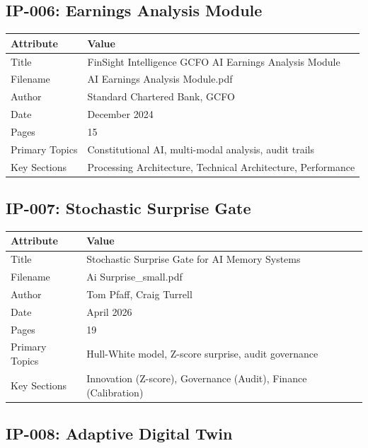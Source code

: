 \subsection{IP-006: Earnings Analysis Module}

\begin{tabularx}{\textwidth}{@{}lX@{}}
\toprule
\textbf{Attribute} & \textbf{Value} \\
\midrule
Title & FinSight Intelligence GCFO AI Earnings Analysis Module \\
Filename & AI Earnings Analysis Module.pdf \\
Author & Standard Chartered Bank, GCFO \\
Date & December 2024 \\
Pages & 15 \\
Primary Topics & Constitutional AI, multi-modal analysis, audit trails \\
Key Sections & Processing Architecture, Technical Architecture, Performance \\
\bottomrule
\end{tabularx}

\subsection{IP-007: Stochastic Surprise Gate}

\begin{tabularx}{\textwidth}{@{}lX@{}}
\toprule
\textbf{Attribute} & \textbf{Value} \\
\midrule
Title & Stochastic Surprise Gate for AI Memory Systems \\
Filename & Ai Surprise\_small.pdf \\
Author & Tom Pfaff, Craig Turrell \\
Date & April 2026 \\
Pages & 19 \\
Primary Topics & Hull-White model, Z-score surprise, audit governance \\
Key Sections & Innovation (Z-score), Governance (Audit), Finance (Calibration) \\
\bottomrule
\end{tabularx}

\subsection{IP-008: Adaptive Digital Twin}

